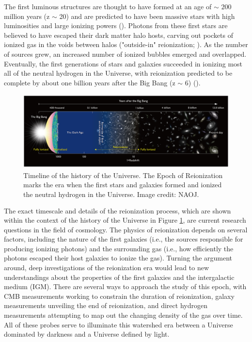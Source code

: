 The first luminous structures are thought to have formed at an age of $\sim$ $200$ million years (z $\sim$ 20) and are predicted to have been massive stars with high luminosities and large ionizing powers (\citealt{loeb_furlanetto_2013}). Photons from these first stars are believed to have escaped their dark matter halo hosts, carving out pockets of ionized gas in the voids between halos ("outside-in" reionization; \citealt{Miralda_Escude_2000}). As the number of sources grew, an increased number of ionized bubbles emerged and overlapped. Eventually, the first generations of stars and galaxies succeeded in ionizing most all of the neutral hydrogen in the Universe, with reionization predicted to be complete by about one billion years after the Big Bang (z $\sim$ 6) (\citealt{furlanetto_et_al2006}). 

\begin{figure}
	\centering
	\includegraphics[width=\columnwidth]{plots/timeline_history.jpg}
	\caption{Timeline of the history of the Universe. The Epoch of Reionization marks the era when the first stars and galaxies formed and ionized the neutral hydrogen in the Universe. Image credit: NAOJ.}
	\label{fig:timeline_history}
\end{figure}

The exact timescale and details of the reionization process, which are shown within the context of the history of the Universe in Figure \ref{fig:timeline_history}, are current research questions in the field of cosmology. The physics of reionization depends on several factors, including the nature of the first galaxies (i.e., the sources responsible for producing ionizing photons) and the surrounding gas (i.e., how efficiently the photons escaped their host galaxies to ionize the gas). Turning the argument around, deep investigations of the reionization era would lead to new understandings about the properties of the first galaxies and the intergalactic medium (IGM). There are several ways to approach the study of this epoch, with CMB measurements working to constrain the duration of reionization, galaxy measurements unveiling the end of reionization, and direct hydrogen measurements attempting to map out the changing density of the gas over time. All of these probes serve to illuminate this watershed era between a Universe dominated by darkness and a Universe defined by light.

